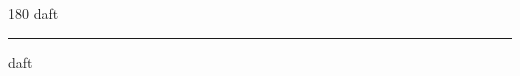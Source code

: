 
\begin{frame}
\begin{center}
\begin{turn}{180}
{\fontsize{2.5cm}{1em}\selectfont daft}
\end{turn}
\vspace{1em}\par  
\hrule
\vspace{1em}\par  
{\fontsize{2.5cm}{1em}\selectfont daft}
\end{center}
\end{frame}
